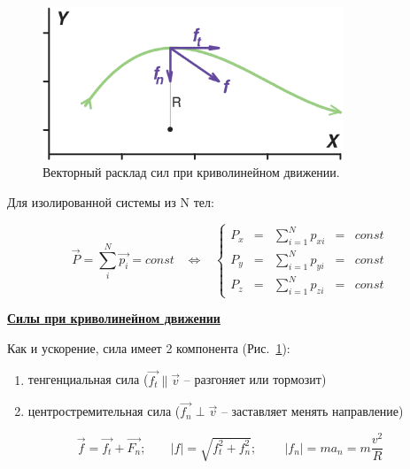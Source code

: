 \begin{figure}[h]
\centering
\includegraphics[width=0.8\textwidth]{GP003/GP003F07.eps}
  \caption{Векторный расклад сил при криволинейном движении.}
   \label{fig:vecurve}
\end{figure}

Для изолированной системы из N тел:

\begin{displaymath}
 \vec{P}=\sum_i^N\vec{p_i}=const\;\;\;\Leftrightarrow\;\;\;
 \left\{ \begin{array}{ccccc}
 P_x&=& \sum_{i=1}^N p_{xi}&=&const\\
 P_y&=& \sum_{i=1}^N p_{yi}&=&const\\
 P_z&=& \sum_{i=1}^N p_{zi}&=&const
 \end{array}
 \right.
\end{displaymath}
\hspace{3mm}

\underline{\bf Силы при криволинейном движении}

Как и ускорение, сила имеет 2 компонента (Рис.~\ref{fig:vecurve}):

\begin{enumerate}
\item тенгенциальная сила ($\vec{f_t}\parallel\vec{v}$ -- разгоняет или тормозит)
\item центростремительная сила ($\vec{f_n}\perp\vec{v}$ -- заставляет менять направление)
\end{enumerate}

\begin{displaymath} \vec{f}=\vec{f_t}+\vec{F_n};\;\;\;\;\;\;\;|f|=\sqrt{f_t^2+f_n^2};\;\;\;\;\;\;\;\;
 |f_n|=ma_n=m \frac{v^2}{R}
\end{displaymath}

